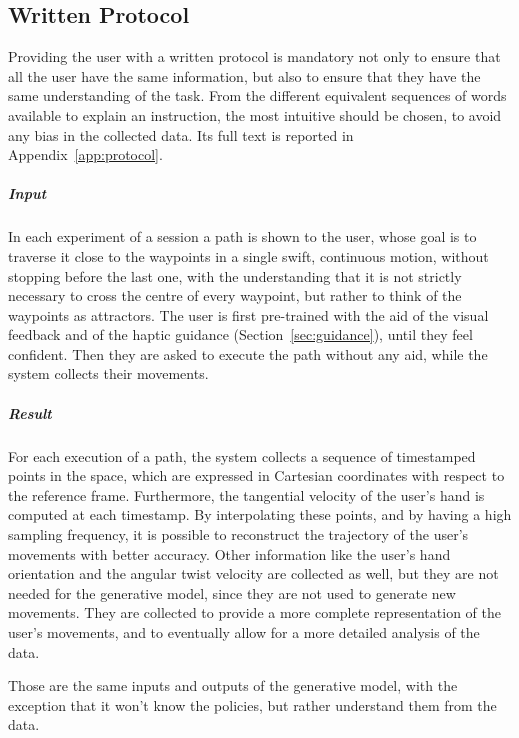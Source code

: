 \documentclass[12pt]{report}
\begin{document}
\subsection{Written Protocol}
\label{sec:written_protocol}
Providing the user with a written protocol is mandatory not only to ensure that all the user have the same information, but also to ensure that they have the same understanding of the task. From the different equivalent sequences of words available to explain an instruction, the most intuitive should be chosen, to avoid any bias in the collected data. Its full text is reported in Appendix~\ref{app:protocol}.
\subparagraph{Input} In each experiment of a session a path is shown to the user, whose goal is to traverse it close to the waypoints in a single swift, continuous motion, without stopping before the last one, with the understanding that it is not strictly necessary to cross the centre of every waypoint, but rather to think of the waypoints as attractors. The user is first pre-trained with the aid of the visual feedback and of the haptic guidance (Section~\ref{sec:guidance}), until they feel confident. Then they are asked to execute the path without any aid, while the system collects their movements.
\subparagraph{Result} For each execution of a path, the system collects a sequence of timestamped points in the space, which are expressed in Cartesian coordinates with respect to the reference frame. Furthermore, the tangential velocity of the user's hand is computed at each timestamp. By interpolating these points, and by having a high sampling frequency, it is possible to reconstruct the trajectory of the user's movements with better accuracy. Other information like the user's hand orientation and the angular twist velocity are collected as well, but they are not needed for the generative model, since they are not used to generate new movements. They are collected to provide a more complete representation of the user's movements, and to eventually allow for a more detailed analysis of the data.

Those are the same inputs and outputs of the generative model, with the exception that it won't know the policies, but rather understand them from the data.
\end{document}
